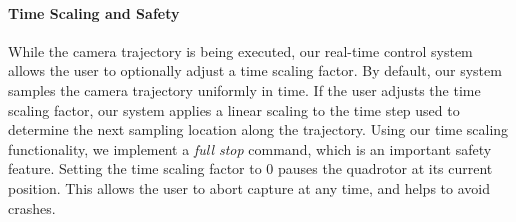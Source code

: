 

\paragraph{Time Scaling and Safety}
While the camera trajectory is being executed, our real-time control system allows the user to optionally adjust a time scaling factor.
By default, our system samples the camera trajectory uniformly in time.
If the user adjusts the time scaling factor, our system applies a linear scaling to the time step used to determine the next sampling location along the trajectory.
Using our time scaling functionality, we implement a \emph{full stop} command, which is an important safety feature.
Setting the time scaling factor to 0 pauses the quadrotor at its current position.
This allows the user to abort capture at any time, and helps to avoid crashes.




